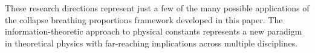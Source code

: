 These research directions represent just a few of the many possible applications of the collapse breathing proportions framework developed in this paper. The information-theoretic approach to physical constants represents a new paradigm in theoretical physics with far-reaching implications across multiple disciplines. 
